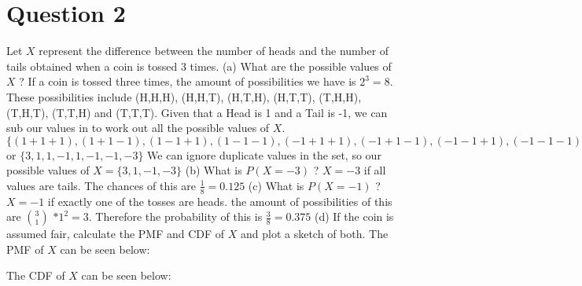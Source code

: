 \documentclass[12pt]{report}
\begin{document}
\section{Question 2}
Let $X$ represent the difference between the number of heads and the number of tails obtained when a coin is tossed 3 times. 
\newline
\newline
(a) What are the possible values of $X$ ?
\newline
If a coin is tossed three times, the amount of possibilities we have is $2^3 = 8$. These possibilities include (H,H,H), (H,H,T), (H,T,H), (H,T,T), (T,H,H), (T,H,T), (T,T,H) and (T,T,T). Given that a Head is 1 and a Tail is -1, we can sub our values in to work out all the possible values of $X$. $\{(1+1+1), (1+1-1), (1-1+1), (1-1-1), (-1+1+1), (-1+1-1), (-1-1+1), (-1-1-1)\}$ or $\{3, 1, 1, -1, 1, -1, -1, -3\}$ We can ignore duplicate values in the set, so our possible values of $X = \{3,1,-1,-3\}$
\newline
\newline
(b) What is $P(X = -3)$ ?
\newline
$X = -3$ if all values are tails. The chances of this are $\frac{1}{8} = 0.125$
\newline
\newline
(c) What is $P(X = -1)$ ?
\newline
$X = -1$ if exactly one of the tosses are heads. the amount of possibilities of this are $3 \choose 1 $ $* 1^2 = 3$. Therefore the probability of this is $\frac{3}{8} = 0.375$
\newline
\newline
(d) If the coin is assumed fair, calculate the PMF and CDF of $X$ and plot a sketch of both. 
\newline
The PMF of $X$ can be seen below:
\begin{center}
\end{center}
\newpage
The CDF of $X$ can be seen below:
\begin{center}
\end{center}
\end{document}
